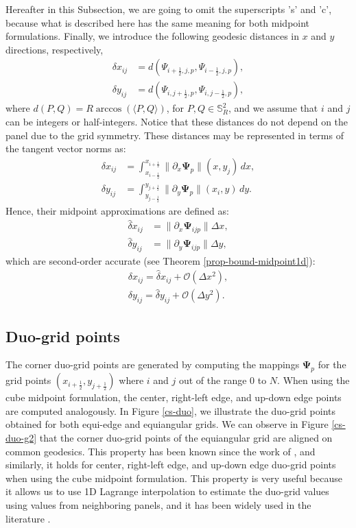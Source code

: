 Hereafter in this Subsection, we are going to omit the superscripts 's' and 'c', because what is described here has the same meaning for both midpoint formulations.
Finally, we introduce the following geodesic distances in $x$ and $y$ directions, respectively,
\begin{align}
	\label{distcube}
	{\delta} x_{ij} &= d(\Psi_{i+\frac{1}{2},j,p},\Psi_{i-\frac{1}{2},j,p}) ,\\
	{\delta} y_{ij} &= d(\Psi_{i,j+\frac{1}{2},p},\Psi_{i,j-\frac{1}{2},p}),
\end{align}
where $d(P,Q) = R\arccos{(\langle P, Q \rangle)}$, for $P,Q \in \mathbb{S}^2_R$, and we assume that $i$ and $j$ can be integers or half-integers.
Notice that these distances do not depend on the panel due to the grid symmetry.
These distances may be represented in terms of the tangent vector norms as:
\begin{align}
	{\delta} x_{ij} &= 
	\int_{x_{i-\frac{1}{2}}}^{x_{i+\frac{1}{2}}}
	\|\partial_x  \mathbf{\Psi}_{p}\|(x,y_j) \,dx ,\\
	{\delta} y_{ij} &=
	\int_{y_{j-\frac{1}{2}}}^{y_{j+\frac{1}{2}}}
	\|\partial_y \mathbf{\Psi}_{p}\|(x_i,y) \,dy.
\end{align}
Hence, their midpoint approximations are defined as:
\begin{align}
	\label{distcube2}
	\hat{\delta} x_{ij} &= \|\partial_x \mathbf{\Psi}_{ijp} \|\Delta x,\\
	\hat{\delta} y_{ij} &= \|\partial_y \mathbf{\Psi}_{ijp} \|\Delta y,
\end{align}
which are second-order accurate (see Theorem \ref{prop-bound-midpoint1d}):
\begin{align}
\delta x_{ij} = \hat{\delta} x_{ij} + \mathcal{O}(\Delta x^2),\\
\delta y_{ij} = \hat{\delta} y_{ij} + \mathcal{O}(\Delta y^2).
\end{align}
\subsection{Duo-grid points}
\label{duogrid-points}
The corner duo-grid points are generated by computing the mappings $\boldsymbol{\Psi}_p$ for the grid points 
$(x_{i+\frac{1}{2}}, y_{j+\frac{1}{2}})$ where $i$ and $j$ out of the range $0$ to $N$. 
When using the cube midpoint formulation, the center, right-left edge, and up-down edge points are computed analogously.
In Figure \ref{cs-duo}, we illustrate the duo-grid points obtained for both equi-edge and equiangular grids.
We can observe in Figure \ref{cs-duo-g2} that the corner duo-grid points of the equiangular grid are aligned on common geodesics.
This property has been known since the work of \citet{ronchi:1996}, and similarly, it holds for center, right-left edge, and up-down edge duo-grid points when using the cube midpoint formulation.
This property is very useful because it allows us to use 1D Lagrange interpolation to estimate the duo-grid values using values 
from neighboring panels, and it has been widely used in the literature \citep{ross:2006, croisille:2013,katta:2015,katta:2015b, chen:2021}.

